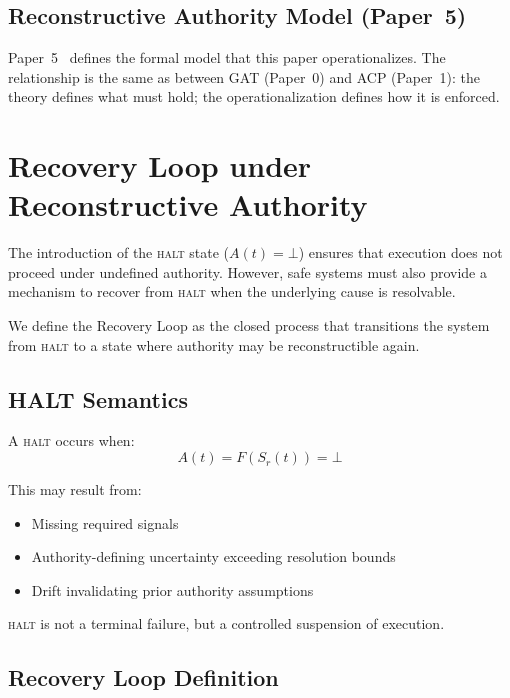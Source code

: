 \documentclass[11pt]{article}
\begin{document}
\subsection{Reconstructive Authority Model (Paper~5)}

Paper~5~\cite{fernandez2026ram} defines the formal model that this paper operationalizes.
The relationship is the same as between GAT (Paper~0) and ACP (Paper~1): the theory
defines what must hold; the operationalization defines how it is enforced.

\section{Recovery Loop under Reconstructive Authority}
\label{sec:recovery}

The introduction of the \textsc{halt} state ($A(t) = \bot$) ensures that execution does
not proceed under undefined authority. However, safe systems must also provide a mechanism
to recover from \textsc{halt} when the underlying cause is resolvable.

We define the Recovery Loop as the closed process that transitions the system from
\textsc{halt} to a state where authority may be reconstructible again.

\subsection{HALT Semantics}

A \textsc{halt} occurs when:
\[
  A(t) = F(S_r(t)) = \bot
\]

This may result from:
\begin{itemize}
  \item Missing required signals
  \item Authority-defining uncertainty exceeding resolution bounds
  \item Drift invalidating prior authority assumptions
\end{itemize}

\textsc{halt} is not a terminal failure, but a controlled suspension of execution.

\subsection{Recovery Loop Definition}
\end{document}
